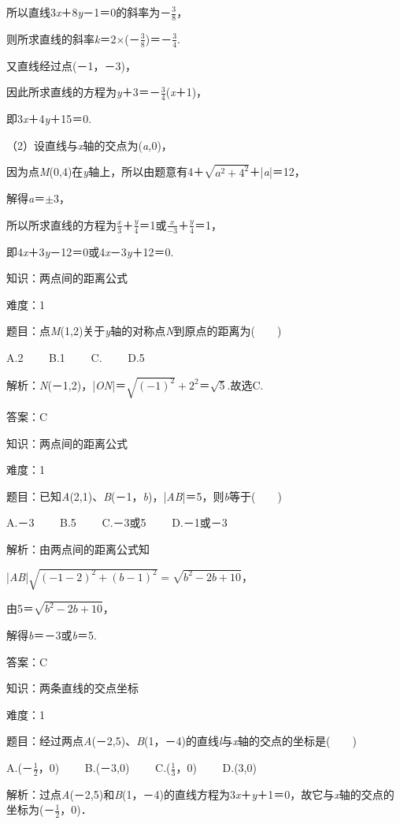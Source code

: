 \documentclass{article} %
\begin{document}
所以直线3\textit{x}＋8\textit{y}－1＝0的斜率为－$\frac{3}{8}$，

则所求直线的斜率\textit{k}＝2$\mathrm{\times}$(－$\frac{3}{8}$)＝－$\frac{3}{4}$.

又直线经过点(－1，－3)，

因此所求直线的方程为\textit{y}＋3＝－$\frac{3}{4}$(\textit{x}＋1)，

即3\textit{x}＋4\textit{y}＋15＝0.

（2）设直线与\textit{x}轴的交点为(\textit{a,}0)，

因为点\textit{M}(0,4)在\textit{y}轴上，所以由题意有4＋$\sqrt{a^2+4^2}$＋|\textit{a}|＝12，

解得\textit{a}＝$\mathrm{\pm}$3，

所以所求直线的方程为$\frac{x}{3}$＋$\frac{y}{4}$＝1或$\frac{x}{-3}$＋$\frac{y}{4}$＝1，

即4\textit{x}＋3\textit{y}－12＝0或4\textit{x}－3\textit{y}＋12＝0.

知识：两点间的距离公式

难度：1

题目：点\textit{M}(1,2)关于\textit{y}轴的对称点\textit{N}到原点的距离为(　　)

A.2　　 B.1　　 C.　　 D.5

解析：\textit{N}(－1,2)，|\textit{ON}|＝$\sqrt{(-1)^2}+2^2$＝$\sqrt{5}$.故选C.

答案：C

知识：两点间的距离公式

难度：1

题目：已知\textit{A}(2,1)、\textit{B}(－1，\textit{b})，|\textit{AB}|＝5，则\textit{b}等于(　　)

A.－3　　 B.5　　 C.－3或5　　 D.－1或－3

解析：由两点间的距离公式知

|\textit{AB}|$\sqrt{(-1-2)^2+(b-1)^2}=\sqrt{b^2-2b+10}$，

由5＝$\sqrt{b^2-2b+10}$，

解得\textit{b}＝－3或\textit{b}＝5.

答案：C

知识：两条直线的交点坐标

难度：1

题目：经过两点\textit{A}(－2,5)、\textit{B}(1，－4)的直线\textit{l}与\textit{x}轴的交点的坐标是(　　)

A.(－$\frac{1}{2}$，0)　　 B.(－3,0)　　 C.($\frac{1}{3}$，0)　　 D.(3,0)

解析：过点\textit{A}(－2,5)和\textit{B}(1，－4)的直线方程为3\textit{x}＋\textit{y}＋1＝0，故它与\textit{x}轴的交点的坐标为(－$\frac{1}{2}$，0)．
\end{document}
